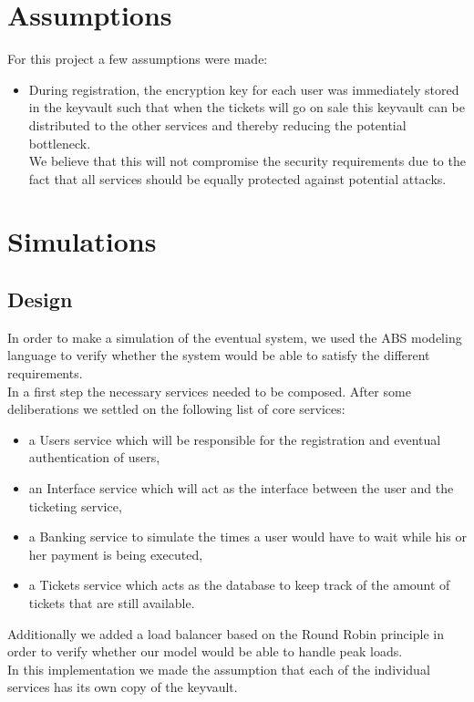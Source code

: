 \documentclass[conference]{IEEEtran}
\begin{document}
\section{Assumptions}
For this project a few assumptions were made:
\begin{itemize}
	\item During registration, the encryption key for each user was immediately stored in the keyvault such that when the tickets will go on sale this keyvault can be distributed to the other services and thereby reducing the potential bottleneck.\\
	We believe that this will not compromise the security requirements due to the fact that all services should be equally protected against potential attacks.
\end{itemize}

\section{Simulations}
\label{simulation}
\subsection{Design}
In order to make a simulation of the eventual system, we used the ABS modeling language to verify whether the system would be able to satisfy the different requirements.\\
In a first step the necessary services needed to be composed. After some deliberations we settled on the following list of core services:
\begin{itemize}
	\item a Users service which will be responsible for the registration and eventual authentication of users,
	\item an Interface service which will act as the interface between the user and the ticketing service,
	\item a Banking service to simulate the times a user would have to wait while his or her payment is being executed,
	\item a Tickets service which acts as the database to keep track of the amount of tickets that are still available.
\end{itemize}
Additionally we added a load balancer based on the Round Robin principle in order to verify whether our model would be able to handle peak loads.\\
In this implementation we made the assumption that each of the individual services has its own copy of the keyvault.
\end{document}

